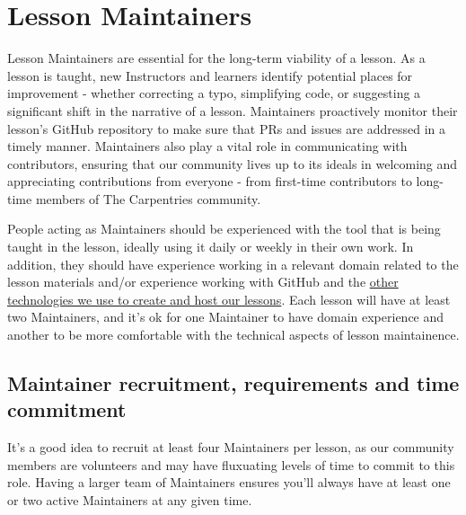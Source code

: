 \documentclass[]{book}
\begin{document}
\hypertarget{lesson-maintainers}{%
\section{Lesson Maintainers}\label{lesson-maintainers}}

Lesson Maintainers are essential for the long-term viability of a lesson. As a
lesson is taught, new Instructors and learners identify potential places
for improvement - whether correcting a typo, simplifying code, or suggesting
a significant shift in the narrative of a lesson. Maintainers proactively monitor
their lesson's GitHub repository to make sure that PRs and issues are addressed
in a timely manner. Maintainers also play a vital role in communicating with
contributors, ensuring that our community lives up to its ideals in welcoming
and appreciating contributions from everyone - from first-time contributors to long-time
members of The Carpentries community.

People acting as Maintainers should be experienced with the tool that is being
taught in the lesson, ideally using it daily or weekly in their own work. In
addition, they should have experience working in a relevant domain related to the
lesson materials and/or experience working with GitHub and the \protect\hyperlink{technological-introductions}{other technologies
we use to create and host our lessons}. Each
lesson will have at least two Maintainers, and it's ok for one Maintainer
to have domain experience and another to be more comfortable with the technical
aspects of lesson maintainence.

\hypertarget{maintainer-recruitment-requirements-and-time-commitment}{%
\subsection{Maintainer recruitment, requirements and time commitment}\label{maintainer-recruitment-requirements-and-time-commitment}}

It's a good idea to recruit at least four Maintainers per lesson, as our
community members are volunteers and may have fluxuating levels of time to
commit to this role. Having a larger team of Maintainers ensures you'll
always have
at least one or two active Maintainers at any given time.
\end{document}
